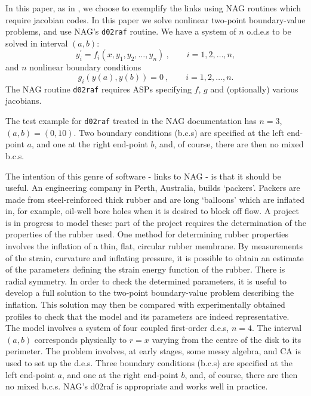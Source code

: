 In this paper,
as in \cite{BKRRD,BK,KN,KR,KL},
we choose to exemplify
the links using NAG routines which require jacobian codes.
In this paper we solve nonlinear two-point boundary-value
problems, and use NAG's {\tt d02raf} routine.
We have a system of $n$ o.d.e.s to be solved in interval $(a,b)$:
$$ y_i^{\prime} = f_i(x,y_1,y_2,\ldots,y_n) \ , \qquad i=1,2,\ldots,n ,$$
and $n$ nonlinear boundary conditions
$$g_i(y(a),y(b)) = 0 \ , \qquad i=1,2,\ldots,n . $$
The NAG routine {\tt d02raf} requires ASPs specifying
$f$, $g$ and (optionally) various jacobians.
\goodbreak

The test example for {\tt d02raf}
treated in the NAG documentation
has $n=3$, $(a,b)=(0,10)$.
Two boundary conditions (b.c.s) are specified at the left end-point $a$,
and one at the right end-point $b$, and, of course,
there are then no mixed b.c.s.

The intention of this genre of software -
links to NAG - is that it should be useful.
An engineering company in Perth, Australia, builds `packers'.
Packers are made from steel-reinforced thick rubber and are
long `balloons' which are inflated in,
for example, oil-well bore holes when it is desired
to block off flow. 
A project is in progress to model these:
part of the project requires the determination
of the properties of the rubber used.
One method for determining rubber properties involves the
inflation of a thin, flat, circular rubber membrane.
By measurements of the strain, curvature and inflating pressure,
it is possible to obtain an estimate of the parameters
defining the strain energy function of the rubber.
There is radial symmetry.
In order to check the determined parameters, it is useful to
develop a full solution to the
two-point boundary-value problem describing the inflation.
This solution may then be compared with experimentally obtained
profiles to check that the model and its parameters are
indeed representative.
The model involves a system of four coupled first-order d.e.s,
$n=4$. The interval $(a,b)$ corresponds physically to
$r=x$ varying from the centre of the disk to its perimeter.
The problem involves, at early stages, some messy algebra,
and CA is used to set up the d.e.s.
Three boundary conditions (b.c.s) are specified at the left end-point $a$,
and one at the right end-point $b$, and, of course,
there are then no mixed b.c.s.
NAG's d02raf is appropriate and works well in practice.

